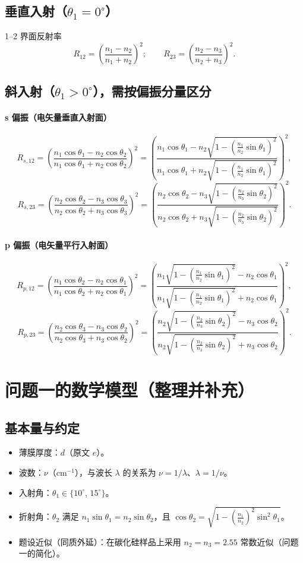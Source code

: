 \documentclass[withoutpreface,bwprint]{cumcmthesis} %
\begin{document}
\subsection{垂直入射（\(\theta_1=0^\circ\)）}
1--2 界面反射率
\[
    R_{12}=\left(\frac{n_1-n_2}{n_1+n_2}\right)^2;\qquad
    R_{23}=\left(\frac{n_2-n_3}{n_2+n_3}\right)^2.
\]
\subsection{斜入射（\(\theta_1>0^\circ\)），需按偏振分量区分}
\paragraph{s 偏振（电矢量垂直入射面）}
\[
    R_{s,12}=\left(\frac{n_1\cos\theta_1 - n_2\cos\theta_2}{n_1\cos\theta_1 + n_2\cos\theta_2}\right)^2
    =\left(\frac{n_1\cos\theta_1 - n_2\sqrt{1-(\tfrac{n_1}{n_2}\sin\theta_1)^2}}{n_1\cos\theta_1 + n_2\sqrt{1-(\tfrac{n_1}{n_2}\sin\theta_1)^2}}\right)^2,
\]
\[
    R_{s,23}=\left(\frac{n_2\cos\theta_2 - n_3\cos\theta_3}{n_2\cos\theta_2 + n_3\cos\theta_3}\right)^2
    =\left(\frac{n_2\cos\theta_2 - n_3\sqrt{1-(\tfrac{n_2}{n_3}\sin\theta_2)^2}}{n_2\cos\theta_2 + n_3\sqrt{1-(\tfrac{n_2}{n_3}\sin\theta_2)^2}}\right)^2.
\]
\paragraph{p 偏振（电矢量平行入射面）}
\[
    R_{p,12}=\left(\frac{n_1\cos\theta_2 - n_2\cos\theta_1}{n_1\cos\theta_2 + n_2\cos\theta_1}\right)^2
    =\left(\frac{n_1\sqrt{1-(\tfrac{n_1}{n_2}\sin\theta_1)^2} - n_2\cos\theta_1}{n_1\sqrt{1-(\tfrac{n_1}{n_2}\sin\theta_1)^2} + n_2\cos\theta_1}\right)^2,
\]
\[
    R_{p,23}=\left(\frac{n_2\cos\theta_3 - n_3\cos\theta_2}{n_2\cos\theta_3 + n_3\cos\theta_2}\right)^2
    =\left(\frac{n_2\sqrt{1-(\tfrac{n_2}{n_3}\sin\theta_2)^2} - n_3\cos\theta_2}{n_2\sqrt{1-(\tfrac{n_2}{n_3}\sin\theta_2)^2} + n_3\cos\theta_2}\right)^2.
\]

\section{问题一的数学模型（整理并补充）}
\subsection{基本量与约定}
\begin{itemize}
    \item 薄膜厚度：\(d\)（原文 \(e\)）。
    \item 波数：\(\nu\)（cm\(^{-1}\)），与波长 \(\lambda\) 的关系为 \(\nu=1/\lambda\)、\(\lambda=1/\nu\)。
    \item 入射角：\(\theta_1\in\{10^\circ,\,15^\circ\}\)。
    \item 折射角：\(\theta_2\) 满足 \(n_1\sin\theta_1=n_2\sin\theta_2\)，且 \(\cos\theta_2=\sqrt{1-(\tfrac{n_1}{n_2})^2\sin^2\theta_1}\)。
    \item 题设近似（同质外延）：在碳化硅样品上采用 \(n_2=n_3=2.55\) 常数近似（问题一的简化）。
\end{itemize}
\end{document}
